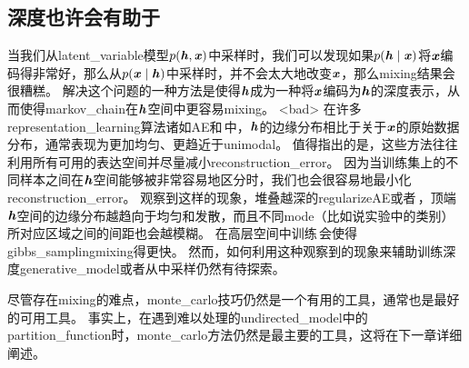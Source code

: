 \subsection{深度也许会有助于}
\label{sec:depth_may_help_mixing}

当我们从\gls{latent_variable}模型$p(\boldsymbol{\mathit{h}},\boldsymbol{\mathit{x}})$中采样时，我们可以发现如果$p(\boldsymbol{\mathit{h}}\mid \boldsymbol{\mathit{x}})$将$\boldsymbol{\mathit{x}}$编码得非常好，那么从$p(\boldsymbol{\mathit{x}} \mid \boldsymbol{\mathit{h}})$中采样时，并不会太大地改变$\boldsymbol{\mathit{x}}$，那么\gls{mixing}结果会很糟糕。
解决这个问题的一种方法是使得$\boldsymbol{\mathit{h}}$成为一种将$\boldsymbol{\mathit{x}}$编码为$\boldsymbol{\mathit{h}}$的深度表示，从而使得\gls{markov_chain}在$\boldsymbol{\mathit{h}}$空间中更容易\gls{mixing}。
<bad> 在许多\gls{representation_learning}算法诸如\gls{AE}和\,中，$\boldsymbol{\mathit{h}}$的边缘分布相比于关于$\boldsymbol{\mathit{x}}$的原始数据分布，通常表现为更加均匀、更趋近于\gls{unimodal}。
值得指出的是，这些方法往往利用所有可用的表达空间并尽量减小\gls{reconstruction_error}。
因为当训练集上的不同样本之间在$\boldsymbol{\mathit{h}}$空间能够被非常容易地区分时，我们也会很容易地最小化\gls{reconstruction_error}。
\citet{Bengio-et-al-ICML2013-small}观察到这样的现象，堆叠越深的\gls{regularize}\gls{AE}或者\,，顶端$\boldsymbol{\mathit{h}}$空间的边缘分布越趋向于均匀和发散，而且不同\gls{mode}（比如说实验中的类别）所对应区域之间的间距也会越模糊。
在高层空间中训练\,会使得\,\gls{gibbs_sampling}\gls{mixing}得更快。
然而，如何利用这种观察到的现象来辅助训练深度\gls{generative_model}或者从中采样仍然有待探索。

尽管存在\gls{mixing}的难点，\gls{monte_carlo}技巧仍然是一个有用的工具，通常也是最好的可用工具。  
事实上，在遇到难以处理的\gls{undirected_model}中的\gls{partition_function}时，\gls{monte_carlo}方法仍然是最主要的工具，这将在下一章详细阐述。
